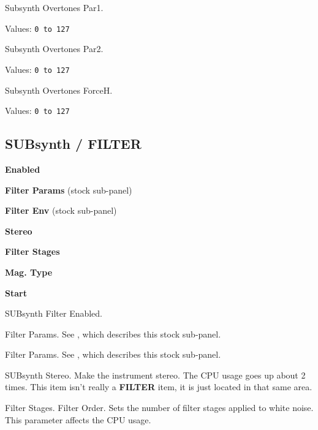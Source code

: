    Subsynth Overtones Par1.

   Values: \texttt{0 to 127}

   Subsynth Overtones Par2.

   Values: \texttt{0 to 127}

   Subsynth Overtones ForceH.

   Values: \texttt{0 to 127}

\subsection{SUBsynth / FILTER}
\label{subsec:subsynth_filter}

   \begin{enumber}
      \item \textbf{Enabled}
      \item \textbf{Filter Params} (stock sub-panel)
      \item \textbf{Filter Env} (stock sub-panel)
      \item \textbf{Stereo}
      \item \textbf{Filter Stages}
      \item \textbf{Mag. Type}
      \item \textbf{Start}
   \end{enumber}

   \setcounter{ItemCounter}{0}      %

   SUBsynth Filter Enabled.

   Filter Params.  See
   ,
   which describes this stock sub-panel.

   Filter Params.  See
   ,
   which describes this stock sub-panel.

   SUBsynth Stereo.
   Make the instrument stereo. The CPU usage goes up about 2 times.
   This item isn't really a \textbf{FILTER} item, it is just located in that
   same area.

   Filter Stages.  Filter Order.
   Sets the number of filter stages applied to white noise. This parameter
   affects the CPU usage. 

